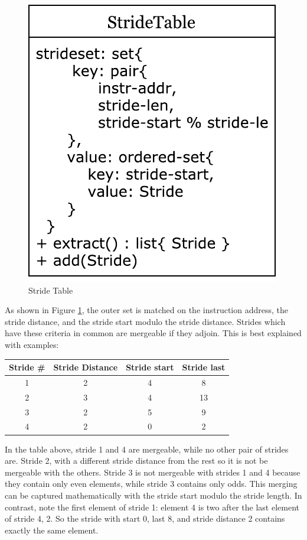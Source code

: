 \documentclass[12pt,twoside]{reedthesis}
\begin{document}
			\begin{figure}[h]
				\caption{Stride Table}
				\label{fig:stride-table}
				\includegraphics[scale=0.8]{stride_data.pdf}
			\end{figure}
			 
			
			As shown in Figure \ref{fig:stride-table}, the outer set is matched on the instruction address, the stride distance, and the stride start modulo the stride distance. Strides which have these criteria in common are mergeable if they adjoin.  This is best explained with examples:
			
			\begin{tabular}{ |c||c|c|c| } 
				\hline
				Stride \# & Stride Distance & Stride start & Stride last \\ 
				\hline
				\hline
				1 & 2 & 4 & 8 \\ \hline
				2 & 3 & 4 & 13 \\ \hline
				3 & 2  & 5  & 9 \\ \hline
				4 & 2  & 0  & 2 \\ 
				\hline
			\end{tabular}
		
			In the table above, stride 1 and 4 are mergeable, while no other pair of strides are. 
			Stride 2, with a different stride distance from the rest so it is not be mergeable with the others. Stride 3 is not mergeable with strides 1 and 4 because they contain only even elements, while stride 3 contains only odds. This merging can be captured mathematically with the stride start modulo the stride length. In contrast, note the first element of stride 1: element 4 is two after the last element of stride 4, 2. So the stride with start 0, last 8, and stride distance 2 contains exactly the same element. 
			
\end{document}
